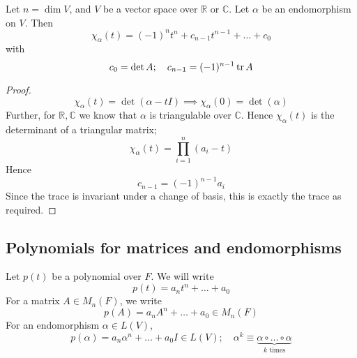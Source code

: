 \begin{lemma}
	Let \( n = \dim V \), and \( V \) be a vector space over \( \mathbb R \) or \( \mathbb C \).
	Let \( \alpha \) be an endomorphism on \( V \).
	Then
	\[
		\chi_\alpha(t) = (-1)^n t^n + c_{n-1} t^{n-1} + \dots + c_0
	\]
	with
	\[
		c_0 = \det A;\quad c_{n-1} = (-1)^{n-1} \tr A
	\]
\end{lemma}
\begin{proof}
	\[
		\chi_\alpha(t) = \det(\alpha - t I) \implies \chi_\alpha(0) = \det(\alpha)
	\]
	Further, for \( \mathbb R, \mathbb C \) we know that \( \alpha \) is triangulable over \( \mathbb C \).
	Hence \( \chi_\alpha(t) \) is the determinant of a triangular matrix;
	\[
		\chi_\alpha(t) = \prod_{i=1}^n (a_i - t)
	\]
	Hence
	\[
		c_{n-1} = (-1)^{n-1} a_i
	\]
	Since the trace is invariant under a change of basis, this is exactly the trace as required.
\end{proof}

\subsection{Polynomials for matrices and endomorphisms}
Let \( p(t) \) be a polynomial over \( F \).
We will write
\[
	p(t) = a_n t^n + \dots + a_0
\]
For a matrix \( A \in M_n(F) \), we write
\[
	p(A) = a_n A^n + \dots + a_0 \in M_n(F)
\]
For an endomorphism \( \alpha \in L(V) \),
\[
	p(\alpha) = a_n \alpha^n + \dots + a_0 I \in L(V);\quad \alpha^k \equiv \underbrace{\alpha \circ \dots \circ \alpha}_{k \text{ times}}
\]

